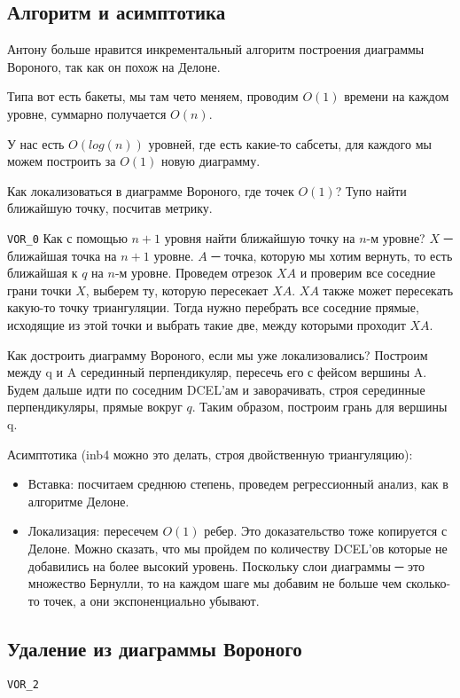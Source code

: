 \documentclass[11pt]{article}
\begin{document}
\subsection{Алгоритм и асимптотика}
\label{sec-24-1}
Антону больше нравится инкрементальный алгоритм построения диаграммы
Вороного, так как он похож на Делоне.

Типа вот есть бакеты, мы там чето меняем, проводим $O(1)$ времени на
каждом уровне, суммарно получается $O(n)$.

У нас есть $O(log(n))$ уровней, где есть какие-то сабсеты, для
каждого мы можем построить за $O(1)$ новую диаграмму.

Как локализоваться в диаграмме Вороного, где точек $O(1)$? Тупо
найти ближайшую точку, посчитав метрику.

\verb~VOR_0~
Как с помощью $n+1$ уровня найти ближайшую точку на $n$-м уровне?
$X$ ─ ближайшая точка на $n+1$ уровне. $A$ ─ точка, которую мы хотим
вернуть, то есть ближайшая к $q$ на $n$-м уровне. Проведем отрезок $XA$ и
проверим все соседние грани точки $X$, выберем ту, которую пересекает
$XA$. $XA$ также может пересекать какую-то точку триангуляции. Тогда
нужно перебрать все соседние прямые, исходящие из этой точки и
выбрать такие две, между которыми проходит $XA$.

Как достроить диаграмму Вороного, если мы уже локализовались?
Построим между q и A серединный перпендикуляр, пересечь его с фейсом
вершины A. Будем дальше идти по соседним DCEL'ам и заворачивать,
строя серединные перпендикуляры, прямые вокруг $q$. Таким образом,
построим грань для вершины q.

Асимптотика (inb4 можно это делать, строя двойственную триангуляцию):
\begin{itemize}
\item Вставка: посчитаем среднюю степень, проведем регрессионный анализ,
как в алгоритме Делоне.
\item Локализация: пересечем $O(1)$ ребер. Это доказательство тоже
копируется с Делоне. Можно сказать, что мы пройдем по количеству
DCEL'ов которые не добавились на более высокий уровень. Поскольку
слои диаграммы ─ это множество Бернулли, то на каждом шаге мы
добавим не больше чем сколько-то точек, а они экспоненциально
убывают.
\end{itemize}
\subsection{Удаление из диаграммы Вороного}
\label{sec-24-2}
\verb~VOR_2~
\end{document}
